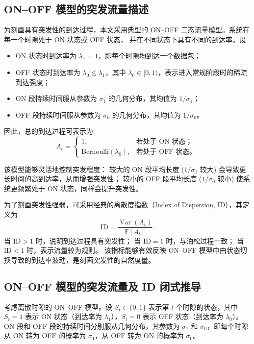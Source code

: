 \subsection{ON--OFF 模型的突发流量描述}

为刻画具有突发性的到达过程，本文采用典型的 ON--OFF
二态流量模型。系统在每一个时隙处于 ON 状态或 OFF 状态，
并在不同状态下具有不同的到达率。设

\begin{itemize}
	\item ON 状态时到达率为 $\lambda_1 = 1$，即每个时隙均到达一个数据包；
	\item OFF 状态时到达率为 $\lambda_0 \leq \lambda_1$，其中 $\lambda_0 \in [0,1)$，表示进入常规阶段时的稀疏到达强度；
	\item ON 段持续时间服从参数为 $\sigma_1$ 的几何分布，其均值为 $1/\sigma_1$；
	\item OFF 段持续时间服从参数为 $\sigma_0$ 的几何分布，其均值为 $1/\sigma_0$。
\end{itemize}

因此，总的到达过程可表示为
\[
A_t =
\begin{cases}
	1, & \text{若处于 ON 状态；}\\[3pt]
	\text{Bernoulli}(\lambda_0), & \text{若处于 OFF 状态。}
\end{cases}
\]

该模型能够灵活地控制突发程度：
较大的 ON 段平均长度 ($1/\sigma_1$ 较大) 会导致更长时间的高到达率，从而增强突发性；
较小的 OFF 段平均长度 ($1/\sigma_0$ 较小) 使系统更频繁处于 ON 状态，同样会提升突发性。

为了刻画突发性强弱，可采用经典的离散度指数（Index of Dispersion, ID），其定义为
\[
\mathrm{ID} = \frac{\operatorname{Var}(A_t)}{\mathbb{E}[A_t]}.
\]
当 $\mathrm{ID} > 1$ 时，说明到达过程具有突发性；
当 $\mathrm{ID} = 1$ 时，与泊松过程一致；
当 $\mathrm{ID} < 1$ 时，表示流量较为规则。
该指标能够有效反映 ON--OFF 模型中由状态切换导致的到达率波动，是刻画突发性的自然度量。


\subsection{ON--OFF 模型的突发流量及 ID 闭式推导}

考虑离散时隙的 ON--OFF 模型。设 $S_t \in \{0,1\}$ 表示第 $t$ 个时隙的状态，其中 $S_t=1$ 表示 ON 状态（到达率为 $\lambda_1$），$S_t=0$ 表示 OFF 状态（到达率为 $\lambda_0$）。ON 段和 OFF 段的持续时间分别服从几何分布，其参数为 $\sigma_1$ 和 $\sigma_0$，即每个时隙从 ON 转为 OFF 的概率为 $\sigma_1$，从 OFF 转为 ON 的概率为 $\sigma_0$。

